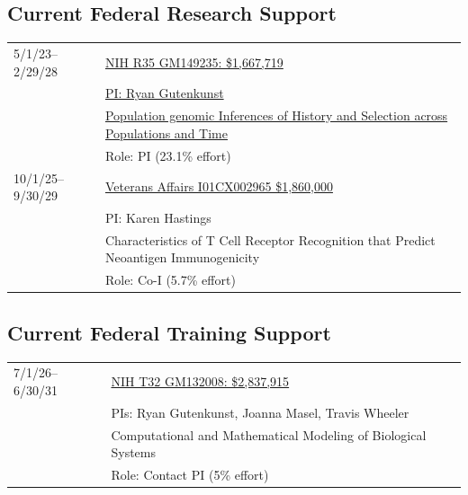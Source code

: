 \documentclass[11pt]{article}
\begin{document}
\subsection*{Current Federal Research Support}
\begin{longtable}[l]{l l}
5/1/23--2/29/28 & \href{https://reporter.nih.gov/project-details/10623079}{NIH R35 GM149235: \$1,667,719}\\
                  & \href{https://reporter.nih.gov/project-details/10623079}{PI: Ryan Gutenkunst}\\
                  &  \href{https://reporter.nih.gov/project-details/10623079}{Population genomic Inferences of History and Selection across Populations and Time}\\
                  & Role: PI (23.1\% effort)\\
10/1/25--9/30/29 & \href{https://reporter.nih.gov/project-details/11184837}{Veterans Affairs I01CX002965 \$1,860,000}\\ 
                & PI: Karen Hastings\\
                & Characteristics of T Cell Receptor Recognition that Predict Neoantigen Immunogenicity\\
                & Role: Co-I (5.7\% effort)\\

\end{longtable}

\subsection*{Current Federal Training Support}
\begin{longtable}[l]{l l}
7/1/26--6/30/31 & \href{https://reporter.nih.gov/project-details/11330713}{NIH T32 GM132008: \$2,837,915}\\
    & PIs: Ryan Gutenkunst, Joanna Masel, Travis Wheeler\\
    & Computational and Mathematical Modeling of Biological Systems\\
    & Role: Contact PI (5\% effort)\\
\end{longtable}
\end{document}
